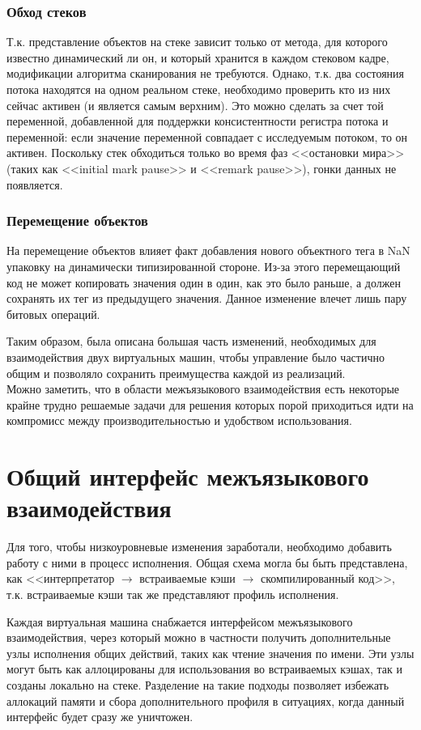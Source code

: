 \documentclass[times
,titlepage
]{itmo-student-thesis}
\begin{document}
\subsection{Обход стеков}
Т.к. представление объектов на стеке зависит только от метода, для которого известно динамический ли он, и который хранится в каждом стековом кадре, модификации алгоритма сканирования не требуются. Однако, т.к. два состояния потока находятся на одном реальном стеке, необходимо проверить кто из них сейчас активен (и является самым верхним). Это можно сделать за счет той переменной, добавленной для поддержки консистентности регистра потока и переменной: если значение переменной совпадает с исследуемым потоком, то он активен. Поскольку стек обходиться только во время фаз <<остановки мира>> (таких как <<initial mark pause>> и <<remark pause>>), гонки данных не появляется.
\subsection{Перемещение объектов}
На перемещение объектов влияет факт добавления нового объектного тега в NaN упаковку на динамически типизированной стороне. Из-за этого перемещающий код не может копировать значения один в один, как это было раньше, а должен сохранять их тег из предыдущего значения. Данное изменение влечет лишь пару битовых операций.


\chapterconclusion
Таким образом, была описана большая часть изменений, необходимых для взаимодействия двух виртуальных машин, чтобы управление было частично общим и позволяло сохранить преимущества каждой из реализаций.\\
Можно заметить, что в области межъязыкового взаимодействия есть некоторые крайне трудно решаемые задачи для решения которых порой приходиться идти на компромисс между производительностью и удобством использования.

\chapter{Общий интерфейс межъязыкового взаимодействия}\label{ch:architecture}
Для того, чтобы низкоуровневые изменения заработали, необходимо добавить работу с ними в процесс исполнения. Общая схема могла бы быть представлена, как <<интерпретатор $\rightarrow$ встраиваемые кэши $\rightarrow$ скомпилированный код>>, т.к. встраиваемые кэши так же представляют профиль исполнения.

Каждая виртуальная машина снабжается интерфейсом межъязыкового взаимодействия, через который можно в частности получить дополнительные узлы исполнения общих действий, таких как чтение значения по имени. Эти узлы могут быть как аллоцированы для использования во встраиваемых кэшах, так и созданы локально на стеке. Разделение на такие подходы позволяет избежать аллокаций памяти и сбора дополнительного профиля в ситуациях, когда данный интерфейс будет сразу же уничтожен.
\end{document}
